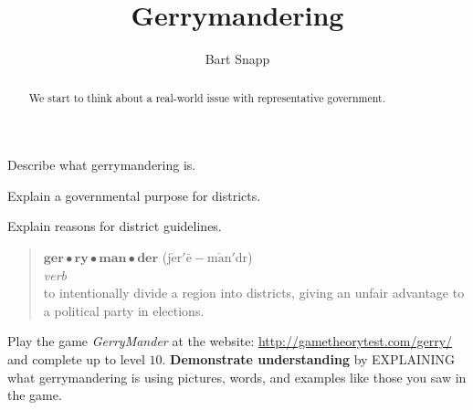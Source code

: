 \documentclass[noauthor,nooutcomes,hints,handout]{ximera}
\title{Gerrymandering}
\author{Bart Snapp}
\begin{document}
\begin{abstract}
  We start to think about a real-world issue with representative government.
\end{abstract}
\maketitle

\begin{listOutcomes}
\item Describe what gerrymandering is.
\item Explain a governmental purpose for districts.
\item Explain reasons for district guidelines.
\end{listOutcomes}
\begin{mdframed}[style=OutcomeStyle]
\begin{quote}
  $\textbf{ger}\bullet\textbf{ry}\bullet\textbf{man}\bullet\textbf{der}$ (j$\check{\text{e}}$r$'\bar{\text{e}}-$m$\check{\text{a}}$n$'$d{}r)
  \\
  
  \textit{verb}\\

  
\quad to intentionally divide a region into districts, giving an
unfair advantage to a political party in elections.
\end{quote}
\end{mdframed}




\mynewpage






\begin{question}
  Play the game \textsl{GerryMander} at the website:
  \url{http://gametheorytest.com/gerry/} and complete up to level $10$.
  \textbf{Demonstrate understanding} by EXPLAINING what
  gerrymandering is using pictures, words, and examples like
  those you saw in the game. 
  
\end{question}


\mynewpage
\end{document}
